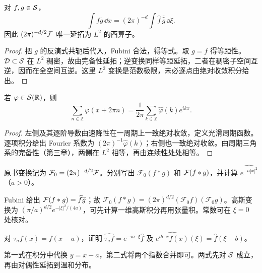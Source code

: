 \begin{proposition}\label{prop:y6-plancherel}
对 $f,g\in\mathcal{S}$，
\[
 \int f\overline g\,\dd x=(2\pi)^{-d}\int\widehat f\,\overline{\widehat g}\,\dd\xi.
\]
因此 $(2\pi)^{-d/2}\mathcal{F}$ 唯一延拓为 $L^2$ 的酉算子。
\end{proposition}
\begin{proof}
把 $g$ 的反演式共轭后代入，Fubini 合法，得等式。取 $g=f$ 得等距性。$\mathcal{D}\subset\mathcal{S}$ 在 $L^2$ 稠密，故由完备性延拓；逆变换同样等距延拓，二者在稠密子空间互逆，因而在全空间互逆。这里 $L^2$ 变换是范数极限，未必逐点由绝对收敛积分给出。
\end{proof}

\begin{proposition}[一维 Poisson 求和]
若 $\varphi\in\mathcal{S}(\mathbb R)$，则
\[
 \sum_{n\in\mathbb Z}\varphi(x+2\pi n)
  =\frac1{2\pi}\sum_{k\in\mathbb Z}\widehat\varphi(k)e^{ikx}.
\]
\end{proposition}
\begin{proof}
左侧及其逐阶导数由速降性在一周期上一致绝对收敛，定义光滑周期函数。逐项积分给出 Fourier 系数为 $(2\pi)^{-1}\widehat\varphi(k)$；右侧也一致绝对收敛。由周期三角系的完备性（第三章），两侧在 $L^2$ 相等，再由连续性处处相等。
\end{proof}

\begin{exercise}[归一化换算]\label{ex:y6-normalization}
原书变换记为 $\mathcal F_0=(2\pi)^{-d/2}\mathcal{F}$。分别写出 $\mathcal F_0(f*g)$ 和 $\mathcal{F}(f*g)$，并计算 $\widehat{e^{-a|x|^2}}$（$a>0$）。
\end{exercise}
\begin{solution}
Fubini 给出 $\mathcal{F}(f*g)=\widehat f\widehat g$；故 $\mathcal F_0(f*g)=(2\pi)^{d/2}(\mathcal F_0f)(\mathcal F_0g)$。高斯变换为 $(\pi/a)^{d/2}e^{-|\xi|^2/(4a)}$，可先计算一维高斯积分再用张量积。常数可在 $\xi=0$ 处核对。
\end{solution}

\begin{exercise}[调制和平移]\label{ex:y6-translation}
对 $\tau_af(x)=f(x-a)$，证明 $\widehat{\tau_af}=e^{-ia\cdot\xi}\widehat f$ 及 $\widehat{e^{ib\cdot x}f(x)}(\xi)=\widehat f(\xi-b)$。
\end{exercise}
\begin{solution}
第一式在积分中代换 $y=x-a$，第二式将两个指数合并即可。两式先对 $\mathcal{S}$ 成立，再由对偶性延拓到温和分布。
\end{solution}
